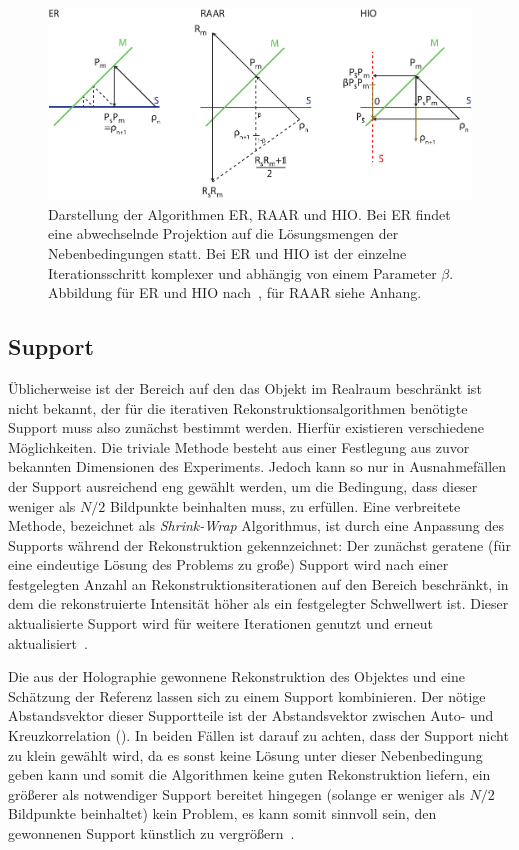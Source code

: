 \begin{figure}
	\centering
	\includegraphics[width=1\textwidth]{images/algorithmen.pdf}
	\caption[Rekonstruktionsalgorithmen]{Darstellung der Algorithmen ER, RAAR und HIO. Bei ER findet eine abwechselnde Projektion auf die Lösungsmengen der Nebenbedingungen statt. Bei ER und HIO ist der einzelne Iterationsschritt komplexer und abhängig von einem Parameter $\beta$. Abbildung für ER und HIO nach~\cite{marchesini2007}, für RAAR siehe Anhang.}
	\label{fig:recon}
\end{figure} 
\subsection{Support}
Üblicherweise ist der Bereich auf den das Objekt im Realraum beschränkt ist nicht bekannt, der für die iterativen Rekonstruktionsalgorithmen benötigte Support muss also zunächst bestimmt werden. Hierfür existieren verschiedene Möglichkeiten. Die triviale Methode besteht aus einer Festlegung aus zuvor bekannten Dimensionen des Experiments. Jedoch kann so nur in Ausnahmefällen der Support ausreichend eng gewählt werden, um die Bedingung, dass dieser weniger als $N/2$ Bildpunkte beinhalten muss, zu erfüllen.
Eine verbreitete Methode, bezeichnet als \textit{Shrink-Wrap} Algorithmus, ist durch eine Anpassung des Supports während der Rekonstruktion gekennzeichnet: Der zunächst geratene (für eine eindeutige Lösung des Problems  zu große) Support wird nach einer festgelegten Anzahl an Rekonstruktionsiterationen auf den Bereich beschränkt, in dem die rekonstruierte Intensität höher als ein festgelegter Schwellwert ist. Dieser aktualisierte Support wird für weitere Iterationen genutzt und erneut aktualisiert~\cite{marchesini2003}.

Die aus der Holographie gewonnene Rekonstruktion des Objektes und eine Schätzung der Referenz lassen sich zu einem Support kombinieren. Der nötige Abstandsvektor dieser Supportteile ist der Abstandsvektor zwischen Auto- und Kreuzkorrelation ().
In beiden Fällen ist darauf zu achten, dass der Support nicht zu klein gewählt wird, da es sonst keine Lösung unter dieser Nebenbedingung geben kann und somit die Algorithmen keine guten Rekonstruktion liefern, ein größerer als notwendiger Support bereitet hingegen (solange er weniger als $N/2$ Bildpunkte beinhaltet) kein Problem, es kann somit sinnvoll sein, den gewonnenen Support künstlich zu vergrößern~\cite{huang2010}.

